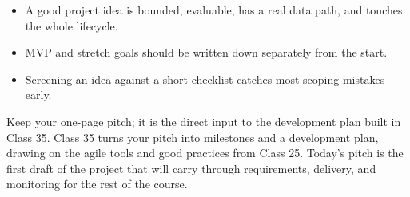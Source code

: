 \classclosingframe
{\begin{itemize}
\item A good project idea is bounded, evaluable, has a real data path, and touches the whole lifecycle.
\item MVP and stretch goals should be written down separately from the start.
\item Screening an idea against a short checklist catches most scoping mistakes early.
\end{itemize}}
{Keep your one-page pitch; it is the direct input to the development plan built in Class 35.}
{Class 35 turns your pitch into milestones and a development plan, drawing on the agile tools and good practices from Class 25.}
{Today's pitch is the first draft of the project that will carry through requirements, delivery, and monitoring for the rest of the course.}


